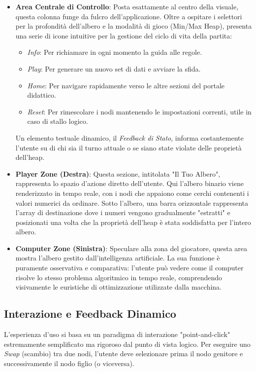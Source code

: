 \documentclass[openany]{theme/uniprthesis}
\begin{document}
\begin{itemize}
    \item \textbf{Area Centrale di Controllo}: Posta esattamente al centro della visuale, questa colonna funge da fulcro dell'applicazione. Oltre a ospitare i selettori per la profondità dell'albero e la modalità di gioco (Min/Max Heap), presenta una serie di icone intuitive per la gestione del ciclo di vita della partita:
    \begin{itemize}
        \item \textit{Info}: Per richiamare in ogni momento la guida alle regole.
        \item \textit{Play}: Per generare un nuovo set di dati e avviare la sfida.
        \item \textit{Home}: Per navigare rapidamente verso le altre sezioni del portale didattico.
        \item \textit{Reset}: Per rimescolare i nodi mantenendo le impostazioni correnti, utile in caso di stallo logico.
    \end{itemize}
    Un elemento testuale dinamico, il \textit{Feedback di Stato}, informa costantemente l'utente su di chi sia il turno attuale o se siano state violate delle proprietà dell'heap.

    \item \textbf{Player Zone (Destra)}: Questa sezione, intitolata "Il Tuo Albero", rappresenta lo spazio d'azione diretto dell'utente. Qui l'albero binario viene renderizzato in tempo reale, con i nodi che appaiono come cerchi contenenti i valori numerici da ordinare. Sotto l'albero, una barra orizzontale rappresenta l'array di destinazione dove i numeri vengono gradualmente "estratti" e posizionati una volta che la proprietà dell'heap è stata soddisfatta per l'intero albero.

    \item \textbf{Computer Zone (Sinistra)}: Speculare alla zona del giocatore, questa area mostra l'albero gestito dall'intelligenza artificiale. La sua funzione è puramente osservativa e comparativa: l'utente può vedere come il computer risolve lo stesso problema algoritmico in tempo reale, comprendendo visivamente le euristiche di ottimizzazione utilizzate dalla macchina.
\end{itemize}

\subsection{Interazione e Feedback Dinamico}
L'esperienza d'uso si basa su un paradigma di interazione "point-and-click" estremamente semplificato ma rigoroso dal punto di vista logico. Per eseguire uno \textit{Swap} (scambio) tra due nodi, l'utente deve selezionare prima il nodo genitore e successivamente il nodo figlio (o viceversa). 
\end{document}
